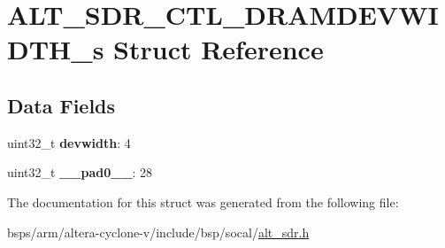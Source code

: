 \hypertarget{structALT__SDR__CTL__DRAMDEVWIDTH__s}{}\section{A\+L\+T\+\_\+\+S\+D\+R\+\_\+\+C\+T\+L\+\_\+\+D\+R\+A\+M\+D\+E\+V\+W\+I\+D\+T\+H\+\_\+s Struct Reference}
\label{structALT__SDR__CTL__DRAMDEVWIDTH__s}
\subsection*{Data Fields}
\begin{DoxyCompactItemize}
\item 
\mbox{\label{structALT__SDR__CTL__DRAMDEVWIDTH__s_a31a9096a9ab2a374e7fd5ab3112dda09}} 
uint32\+\_\+t {\bfseries devwidth}\+: 4
\item 
\mbox{\label{structALT__SDR__CTL__DRAMDEVWIDTH__s_af3876b5df107f16c2586c7ba9aa60bec}} 
uint32\+\_\+t {\bfseries \+\_\+\+\_\+pad0\+\_\+\+\_\+}\+: 28
\end{DoxyCompactItemize}


The documentation for this struct was generated from the following file\+:\begin{DoxyCompactItemize}
\item 
bsps/arm/altera-\/cyclone-\/v/include/bsp/socal/\mbox{\hyperlink{alt__sdr_8h}{alt\+\_\+sdr.\+h}}\end{DoxyCompactItemize}
